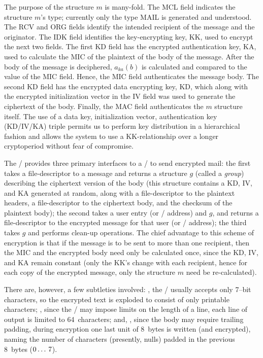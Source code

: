The purpose of the structure $m$ is many-fold.
The MCL field indicates the structure $m$'s type;
currently only the type MAIL is generated and understood.
The RCV and ORG fields identify the intended recipient of the message
and the originator.
The IDK field identifies the key-encrypting key, KK,
used to encrypt the next two fields.
The first KD field has the encrypted authentication key, KA,
used to calculate the MIC of the plaintext of the body of the message.
After the body of the message is deciphered, $a_{ka}(b)$ is calculated and
compared to the value of the MIC field.
Hence, the MIC field authenticates the message body.
The second KD field has the encrypted data encrypting key, KD,
which along with the encrypted initialization vector in the IV field
was used to generate the ciphertext of the body.
Finally, the MAC field authenticates the $m$ structure itself.
The use of a data key, initialization vector, authentication key (KD/IV/KA)
triple permits us to perform key distribution in a hierarchical fashion and
allows the system to use a KK-relationship over a longer cryptoperiod
without fear of compromise.

The \TMA/ provides three primary interfaces to a \UA/ to send encrypted mail:
the first takes a file-descriptor to a message
and returns a structure $g$ (called a {\it group})
describing the ciphertext version of the body
(this structure contains a KD, IV, and KA generated at random,
along with a file-descriptor to the plaintext headers,
a file-descriptor to the ciphertext body,
and the checksum of the plaintext body);
the second takes a user entry (or \MTS/ address) and $g$,
and returns a file-descriptor to the encrypted message
for that user (or \MTS/ address);
the third takes $g$ and performs clean-up operations.
The chief advantage to this scheme of encryption
is that if the message is to be sent to more than one recipient,
then the MIC and the encrypted body need only be calculated once,
since the KD, IV, and KA remain constant
(only the KK's change with each recipient,
hence for each copy of the encrypted message,
only the structure $m$ need be re-calculated).

There are, however, a few subtleties involved:
,
the \MTS/ usually accepts only 7--bit characters,
so the encrypted text is exploded to consist of only printable characters;%
,
since the \MTS/ may impose limits on the length of a line,
each line of output is limited to 64~characters;
and,
,
since the body may require trailing padding,
during encryption
one last unit of 8~bytes is written (and encrypted),
naming the number of characters (presently, nulls) padded in the
previous 8~bytes ($0\ldots\thinspace7$).

